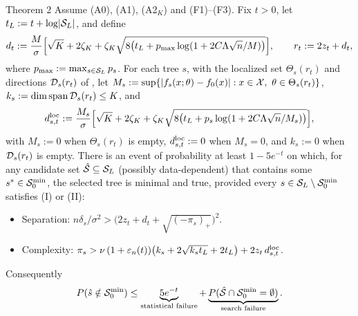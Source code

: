 \begin{result}[Theorem2]{Theorem 2}
Assume (A0), (A1), (A2$_K$) and (F1)--(F3). Fix $t > 0$, let $t_L := t + \log\lvert \mathcal{S}_L\rvert$, and define
\[
d_t := \frac{M}{\sigma}\Bigl[\sqrt K + 2\zeta_K + \zeta_K\sqrt{8\bigl(t_L + p_{\max}\log(1 + 2C\Lambda\sqrt n/M)\bigr)}\Bigr], \qquad r_t := 2z_t + d_t,
\]
where $p_{\max} := \max_{s \in \mathcal{S}_L}p_s$. For each tree $s$, with the localized set $\Theta_s(r_t)$ and directions $\mathcal{D}_s(r_t)$ of , let $M_s := \sup\{\lvert f_s(x;\theta) - f_0(x)\rvert : x \in \mathcal{X},\ \theta \in \Theta_s(r_t)\}$, $k_s := \dim\mathrm{span}\,\mathcal{D}_s(r_t) \le K$, and
\[
d^{\mathrm{loc}}_{s,t} := \frac{M_s}{\sigma}\Bigl[\sqrt K + 2\zeta_K + \zeta_K\sqrt{8\bigl(t_L + p_s\log(1 + 2C\Lambda\sqrt n/M_s)\bigr)}\Bigr],
\]
with $M_s := 0$ when $\Theta_s(r_t)$ is empty, $d^{\mathrm{loc}}_{s,t} := 0$ when $M_s = 0$, and $k_s := 0$ when $\mathcal{D}_s(r_t)$ is empty. There is an event of probability at least $1 - 5e^{-t}$ on which, for any candidate set $\hat{\mathcal{S}} \subseteq \mathcal{S}_L$ (possibly data-dependent) that contains some $s^* \in \mathcal{S}_0^{\min}$, the selected tree is minimal and true, provided every $s \in \mathcal{S}_L \setminus \mathcal{S}_0^{\min}$ satisfies (I) or (II):
\begin{itemize}
\item[(I)] Separation: $n\delta_s/\sigma^2 > \bigl(2z_t + d_t + \sqrt{(-\pi_s)_+}\bigr)^2$.
\item[(II)] Complexity: $\pi_s > \nu\,(1 + \varepsilon_n(t))\bigl(k_s + 2\sqrt{k_st_L} + 2t_L\bigr) + 2z_t\,d^{\mathrm{loc}}_{s,t}$.
\end{itemize}
Consequently
\[
P(\hat s \notin \mathcal{S}_0^{\min}) \le \underbrace{5e^{-t}}_{\text{statistical failure}} + \underbrace{P(\hat{\mathcal{S}} \cap \mathcal{S}_0^{\min} = \emptyset)}_{\text{search failure}}.
\]
\end{result}

